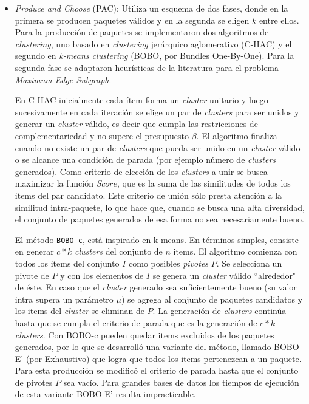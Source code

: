 \begin{itemize}

\item {\em Produce and Choose} (PAC): Utiliza un esquema de dos fases, donde en la primera se producen paquetes válidos y en la segunda se eligen $k$ entre ellos. Para la producción de paquetes se implementaron dos algoritmos de {\em clustering}, uno basado en {\em clustering} jerárquico aglomerativo (C-HAC) y el segundo en {\em k-means clustering} (BOBO, por Bundles One-By-One). Para la segunda fase se adaptaron heurísticas de la literatura para el problema {\em Maximum Edge Subgraph}.

En C-HAC inicialmente cada ítem forma un {\em cluster} unitario y luego sucesivamente en cada iteración se elige un par de {\em clusters} para ser unidos y generar un {\em cluster} válido, es decir que cumpla las restricciones de complementariedad y no supere el presupuesto $\beta$. El algoritmo finaliza cuando no existe un par de {\em clusters} que pueda ser unido en un {\em cluster} válido o se alcance una condición de parada (por ejemplo número de {\em clusters} generados). Como criterio de elección de los {\em clusters} a unir se busca maximizar la función $Score$, que es la suma de las similitudes de todos los items del par candidato. Este criterio de unión sólo presta atención a la similitud intra-paquete, lo que hace que, cuando se busca una alta diversidad, el conjunto de paquetes generados de esa forma no sea necesariamente bueno.

El método \texttt{BOBO-c}, está inspirado en k-means. En términos simples, consiste en generar $c*k$ {\em clusters} del conjunto de $n$ items. El algoritmo comienza con todos los items del conjunto $I$ como posibles \emph{pivotes} $P$. Se selecciona un pivote de $P$ y con los elementos de $I$ se genera un {\em cluster} válido ``alrededor" de éste. En caso que el {\em cluster} generado sea suficientemente bueno (su valor intra supera un parámetro $\mu$) se agrega al conjunto de paquetes candidatos y los items del {\em cluster} se eliminan de $P$. La generación de {\em clusters} continúa hasta que se cumpla el criterio de parada que es la generación de $c*k$ {\em clusters}. Con BOBO-c pueden quedar items excluidos de los paquetes generados, por lo que se desarrolló una variante del método, llamado BOBO-E' (por Exhaustivo) que logra que todos los items pertenezcan a un paquete. Para esta producción se modificó el criterio de parada hasta que el conjunto de pivotes $P$ sea vacío. Para grandes bases de datos los tiempos de ejecución de esta variante BOBO-E' resulta impracticable.


\end{itemize}
